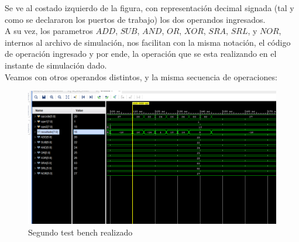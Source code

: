 \documentclass[paper=letter, fontsize=12pt]{article}
\begin{document}
Se ve al costado izquierdo de la figura, con representación decimal signada (tal y como se declararon los puertos de trabajo) los dos operandos ingresados.\\
A su vez, los parametros $ADD$, $SUB$, $AND$, $OR$, $XOR$, $SRA$, $SRL$, y $NOR$, internos al archivo de simulación, nos facilitan con la misma notación,
 el código de operación ingresado y por ende, la operación que se esta realizando en el instante de simulación dado.\\

Veamos con otros operandos distintos, y la misma secuencia de operaciones:\\

\begin{figure}[H]
\centering
\includegraphics[scale=0.6]{testbench2.png}
\caption{Segundo test bench realizado}
\end{figure}




\end{document}
